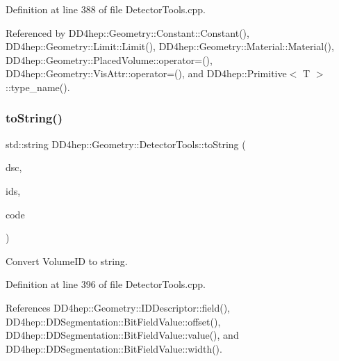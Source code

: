 Definition at line 388 of file Detector\+Tools.\+cpp.



Referenced by D\+D4hep\+::\+Geometry\+::\+Constant\+::\+Constant(), D\+D4hep\+::\+Geometry\+::\+Limit\+::\+Limit(), D\+D4hep\+::\+Geometry\+::\+Material\+::\+Material(), D\+D4hep\+::\+Geometry\+::\+Placed\+Volume\+::operator=(), D\+D4hep\+::\+Geometry\+::\+Vis\+Attr\+::operator=(), and D\+D4hep\+::\+Primitive$<$ T $>$\+::type\+\_\+name().

\hypertarget{namespace_d_d4hep_1_1_geometry_1_1_detector_tools_ae5de1f83490fd1476f7663078ffc08c7}{}\label{namespace_d_d4hep_1_1_geometry_1_1_detector_tools_ae5de1f83490fd1476f7663078ffc08c7} 
\subsubsection{\texorpdfstring{to\+String()}{toString()}\hspace{0.1cm}{\footnotesize\ttfamily [2/2]}}
{\footnotesize\ttfamily std\+::string D\+D4hep\+::\+Geometry\+::\+Detector\+Tools\+::to\+String (\begin{DoxyParamCaption}\item[{const \hyperlink{class_d_d4hep_1_1_geometry_1_1_i_d_descriptor}{I\+D\+Descriptor} \&}]{dsc,  }\item[{const \hyperlink{class_d_d4hep_1_1_geometry_1_1_placed_volume_a4383991fbc94adc2997ef98c9d30d9a6}{Placed\+Volume\+::\+Vol\+I\+Ds} \&}]{ids,  }\item[{Volume\+ID}]{code }\end{DoxyParamCaption})}



Convert Volume\+ID to string. 



Definition at line 396 of file Detector\+Tools.\+cpp.



References D\+D4hep\+::\+Geometry\+::\+I\+D\+Descriptor\+::field(), D\+D4hep\+::\+D\+D\+Segmentation\+::\+Bit\+Field\+Value\+::offset(), D\+D4hep\+::\+D\+D\+Segmentation\+::\+Bit\+Field\+Value\+::value(), and D\+D4hep\+::\+D\+D\+Segmentation\+::\+Bit\+Field\+Value\+::width().

